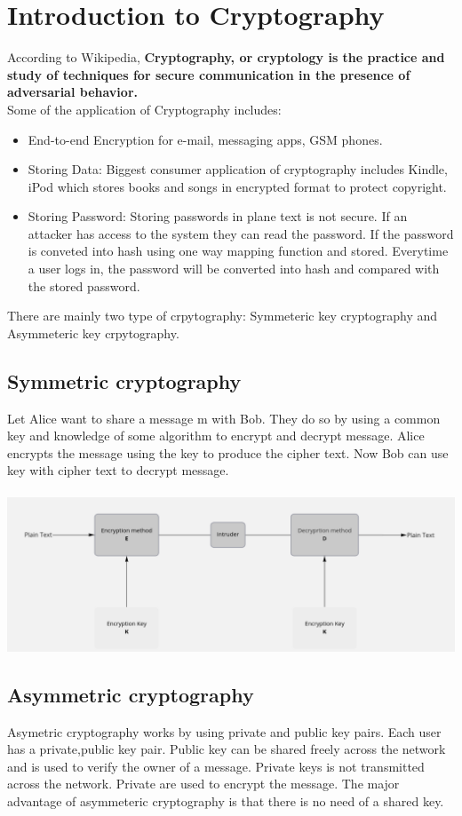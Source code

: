 \documentclass[12pt,a4paper]{report}
\begin{document}
	\section{Introduction to Cryptography}
	According to Wikipedia, \textbf{Cryptography, or cryptology is the practice and study of techniques for secure communication in the presence of adversarial behavior.}
	\\Some of the application of Cryptography includes:
	\begin{itemize}
  \item End-to-end Encryption for e-mail, messaging apps, GSM phones.
  \item Storing Data: Biggest consumer application of cryptography includes Kindle, iPod which stores books and songs in encrypted format to protect copyright.
  \item Storing Password: Storing passwords in plane text is not secure. If an attacker has access to the system they can read the password. If the password is conveted into hash using one way mapping function and stored. Everytime a user logs in, the password will be converted into hash and compared with the stored password.
\end{itemize}
There are mainly two type of crpytography: Symmeteric key cryptography and Asymmeteric key crpytography. 	
\cleardoublepage

	
	\subsection{Symmetric cryptography}
	Let Alice want to share a message m with Bob. They do so by using a common key and knowledge of some algorithm to encrypt and decrypt message. Alice encrypts the message using the key to produce the cipher text. Now Bob can use key with cipher text to decrypt message.  \\\\
	\includegraphics[scale=0.4]{sym}
	\subsection{Asymmetric cryptography}
	Asymetric cryptography works by using private and public key pairs.
	Each user has a private,public key pair. Public key can be shared freely across the network and is used to verify the owner of a message.
	Private keys is not transmitted across the network. Private are used to encrypt the message. The major advantage of asymmeteric cryptography is that there is no need of a shared key. 
	\cleardoublepage	
\end{document}
